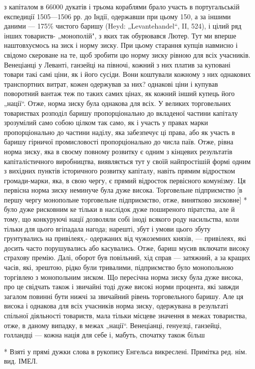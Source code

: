 \parcont{}  %
з капіталом в 66000 дукатів і трьома кораблями брало участь в португальській експедиції 1505—1506 рр. до Індії, одержавши
при цьому 150, а за іншими даними — 175\% чистого баришу (Heyd: „Levantehandel“, II, 524), і цілий ряд інших товариств-
„монополій", з яких так обурювався Лютер. Тут ми вперше наштовхуємось на зиск і норму зиску. При цьому старання купців
навмисно і свідомо скероване на те, щоб зробити цю норму зиску рівною для всіх учасників. Венеціанці у Леванті, ганзейці на
півночі, кожний з них платив за куповані товари такі самі ціни, як і його сусіди. Вони коштували кожному з них однакових
транспортних витрат, кожен одержував за них? однакові ціни і купував поворотний вантаж теж по таких самих цінах, як кожний
інший купець його „нації“. Отже, норма зиску була однакова для всіх. У великих торговельних товариствах розподіл баришу
пропорціонально до вкладеної частини капіталу зрозумілий само собою цілком так само, як і участь у правах марки
пропорціонально до частини наділу, яка забезпечує ці права, або як участь в баришу гірничої промисловості пропорціонально
до числа паїв. Отже, рівна норма зиску, яка в своєму повному розвитку є одним з кінцевих результатів капіталістичного
виробництва, виявляється тут у своїй найпростішій формі одним з вихідних пунктів історичного розвитку капіталу, навіть
прямим відростком громади-марки, яка, в свою чергу, є прямий відросток первісного комунізму. Ця первісна норма зиску
неминуче була дуже висока. Торговельне підприємство [в першу чергу монопольне торговельне підприємство, отже, винятково
зисковне] * було дуже рисковним ке тільки в наслідок дуже поширеного піратства, але й тому, що конкуруючі нації дозволяли
собі іноді всякого роду насильства, коли тільки для цього вгіпадала нагода; нарешті, збут і умови цього збуту грунтувались
на привілеях,-  одержаних від чужоземних князів, — привілеях, які досить часто порушувались або касувались. Отже, бариш
мусив включати високу страхову премію. Далі, оборот був повільний, хід справ — затяжний, а за кращих часів, які, зрештою,
рідко були тривалими, підприємство було монопольною торгівлею з монопольним зиском. Що пересічна норма зиску була дуже
висока, про це свідчать також і звичайні тоді дуже високі норми процента, які завжди загалом повинні бути нижчі за
звичайний рівень торговельного баришу. Але ця висока і однакова для всіх учасників норма зиску, одержувана в результаті
спільної діяльності товариств, мала тільки місцеве значення в межах товариства, отже, в даному випадку, в межах „нації“.
Венеціанці, генуезці, ганзейці, голландці — кожна нація для себе і, мабуть, спочатку також більш

* Взяті у прямі дужки слова в рукопису Енгельса викреслені. Примітка ред. нім. вид. ІМЕЛ.
\parbreak{}  %

